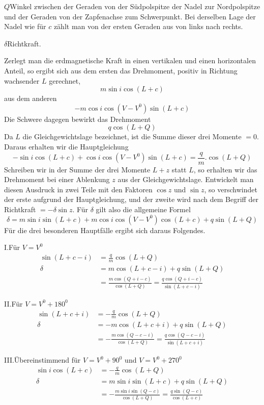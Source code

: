 $Q$\quad Winkel zwischen der Geraden von der Südpolspitze der Nadel zur Nordpolspitze und der Geraden von der Zapfenachse zum Schwerpunkt. Bei derselben Lage der Nadel wie für $c$ zählt man von der ersten Geraden aus von links nach rechts.

$\delta$\quad Richtkraft.

Zerlegt man die erdmagnetische Kraft in einen vertikalen und einen horizontalen Anteil, so ergibt sich aus dem ersten das Drehmoment, positiv in Richtung wachsender $L$ gerechnet,
\[
m\sin i\cos(L+c)
\]
aus dem anderen
\[
-m\cos i\cos(V-V^0)\sin(L+c)
\]
Die Schwere dagegen bewirkt das Drehmoment
\[
q\cos(L+Q)
\]
Da $L$ die Gleichgewichtslage bezeichnet, ist die Summe dieser drei Momente $=0$. Daraus erhalten wir die Hauptgleichung
\[
-\sin i\cos(L+c)+\cos i\cos(V-V^0)\sin(L+c)=\frac{q}{m}.\cos(L+Q)
\]
Schreiben wir in der Summe der drei Momente $L+z$ statt $L$, so erhalten wir das Drehmoment bei einer Ablenkung $z$ aus der Gleichgewichtslage. Entwickelt man diesen Ausdruck in zwei Teile mit den Faktoren $\cos z$ und $\sin z$, so verschwindet der erste aufgrund der Hauptgleichung, und der zweite wird nach dem Begriff der Richtkraft $=-\delta\sin z$.
Für $\delta$ gilt also die allgemeine Formel
\[
\delta=m\sin i\sin(L+c)+m\cos i\cos(V-V^0)\cos(L+c)+q\sin(L+Q)
\]
Für die drei besonderen Hauptfälle ergibt sich daraus Folgendes.

I.\quad Für $V=V^0$
\[
\begin{aligned}
\sin(L+c-i)&=\frac{q}{m}\cos(L+Q)\\
\delta&=m\cos(L+c-i)+q\sin(L+Q)\\
&=\frac{m\cos(Q+i-c)}{\cos(L+Q)}=\frac{q\cos(Q+i-c)}{\sin(L+c-i)}
\end{aligned}
\]

II.\quad Für $V=V^0+180^0$
\[
\begin{aligned}
\sin(L+c+i)&=-\frac{q}{m}\cos(L+Q)\\
\delta&=-m\cos(L+c+i)+q\sin(L+Q)\\
&=-\frac{m\cos(Q-c-i)}{\cos(L+Q)}=\frac{q\cos(Q-c-i)}{\sin(L+c+i)}
\end{aligned}
\]

III.\quad Übereinstimmend für $V=V^0+90^0$ und $V=V^0+270^0$
\[
\begin{aligned}
\sin i\cos(L+c)&=-\frac{q}{m}\cos(L+Q)\\
\delta&=m\sin i\sin(L+c)+q\sin(L+Q)\\
&=-\frac{m\sin i\sin(Q-c)}{\cos(L+Q)}=\frac{q\sin(Q-c)}{\cos(L+c)}
\end{aligned}
\]

